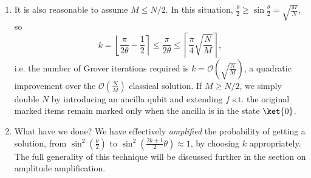 \begin{enumerate}
    \item It is also reasonable to assume $M \leq N/2$. In this situation, $\frac{\theta}{2} \geq \sin \frac{\theta}{2} = \sqrt{\frac{M}{N}}$, so
    \[
        k = \left\lfloor \frac{\pi}{2\theta} - \frac{1}{2} \right\rceil \leq \frac{\pi}{2\theta} \leq \left\lceil \frac{\pi}{4}\sqrt{\frac{N}{M}} \right\rceil,
    \]
    i.e. the number of Grover iterations required is $k = \mathcal{O}(\sqrt{\frac{N}{M}})$, a quadratic improvement over the $\mathcal{O}(\frac{N}{M})$ classical solution. If $M \geq N/2$, we simply double $N$ by introducing an ancilla qubit and extending $f$ s.t. the original marked items remain marked only when the ancilla is in the state $\ket{0}$.

    \item What have we done? We have effectively \textit{amplified} the probability of getting a solution, from $\sin^2\left(\frac{\theta}{2}\right)$ to $\sin^2\left(\frac{2k+1}{2}\theta \right) \approx 1$, by choosing $k$ appropriately. The full generality of this technique will be discussed further in the section on amplitude amplification.
\end{enumerate}













% 
% 
% 
